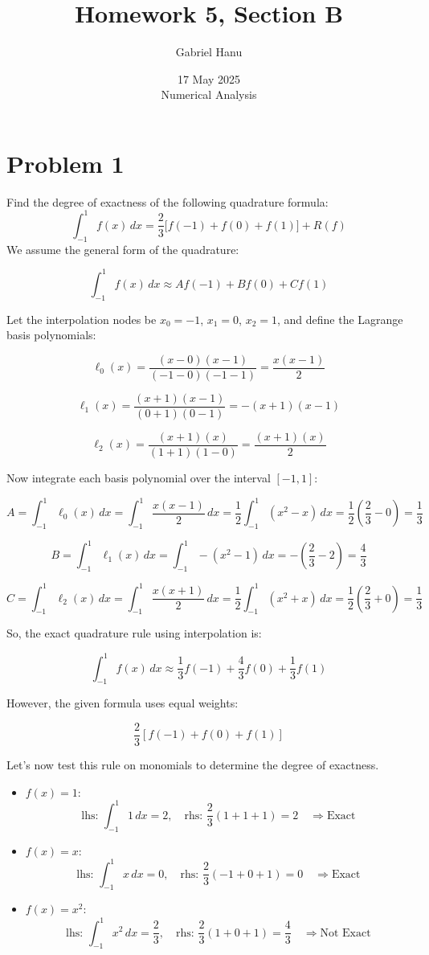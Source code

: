 \documentclass{article}
\title{Homework 5, Section B}
\author{Gabriel Hanu}
\date{17 May 2025 \\
Numerical Analysis}
\begin{document}
\maketitle

\section*{Problem 1}
Find the degree of exactness of the following quadrature formula:
\[
    \int_{-1}^{1} f(x) \, dx = \frac{2}{3} \big[f(-1) + f(0) + f(1)\big] +R(f)
\]
We assume the general form of the quadrature:

\[
\int_{-1}^{1} f(x)\,dx \approx A f(-1) + B f(0) + C f(1)
\]

Let the interpolation nodes be \( x_0 = -1 \), \( x_1 = 0 \), \( x_2 = 1 \), and define the Lagrange basis polynomials:

\[
\ell_0(x) = \frac{(x - 0)(x - 1)}{(-1 - 0)(-1 - 1)} = \frac{x(x - 1)}{2}
\]

\[
\ell_1(x) = \frac{(x + 1)(x - 1)}{(0 + 1)(0 - 1)} = - (x + 1)(x - 1)
\]

\[
\ell_2(x) = \frac{(x + 1)(x)}{(1 + 1)(1 - 0)} = \frac{(x + 1)(x)}{2}
\]

Now integrate each basis polynomial over the interval \([-1, 1]\):

\[
A = \int_{-1}^{1} \ell_0(x)\,dx = \int_{-1}^{1} \frac{x(x - 1)}{2}\,dx
= \frac{1}{2} \int_{-1}^{1} (x^2 - x)\,dx
= \frac{1}{2} \left( \frac{2}{3} - 0 \right) = \frac{1}{3}
\]

\[
B = \int_{-1}^{1} \ell_1(x)\,dx = \int_{-1}^{1} - (x^2 - 1)\,dx
= - \left( \frac{2}{3} - 2 \right) = \frac{4}{3}
\]

\[
C = \int_{-1}^{1} \ell_2(x)\,dx = \int_{-1}^{1} \frac{x(x + 1)}{2}\,dx
= \frac{1}{2} \int_{-1}^{1} (x^2 + x)\,dx
= \frac{1}{2} \left( \frac{2}{3} + 0 \right) = \frac{1}{3}
\]

So, the exact quadrature rule using interpolation is:

\[
\int_{-1}^{1} f(x)\,dx \approx \frac{1}{3} f(-1) + \frac{4}{3} f(0) + \frac{1}{3} f(1)
\]

However, the given formula uses equal weights:

\[
\frac{2}{3} [f(-1) + f(0) + f(1)]
\]

Let’s now test this rule on monomials to determine the degree of exactness.

\begin{itemize}
  \item \( f(x) = 1 \):
  \[
  \text{lhs: } \int_{-1}^{1} 1\,dx = 2, \quad
  \text{rhs: } \frac{2}{3} (1 + 1 + 1) = 2 \quad \Rightarrow \text{Exact}
  \]

  \item \( f(x) = x \):
  \[
  \text{lhs: } \int_{-1}^{1} x\,dx = 0, \quad
  \text{rhs: } \frac{2}{3} (-1 + 0 + 1) = 0 \quad \Rightarrow \text{Exact}
  \]

  \item \( f(x) = x^2 \):
  \[
  \text{lhs: } \int_{-1}^{1} x^2\,dx = \frac{2}{3}, \quad
  \text{rhs: } \frac{2}{3} (1 + 0 + 1) = \frac{4}{3} \quad \Rightarrow \text{Not Exact}
  \]
\end{itemize}
\end{document}
